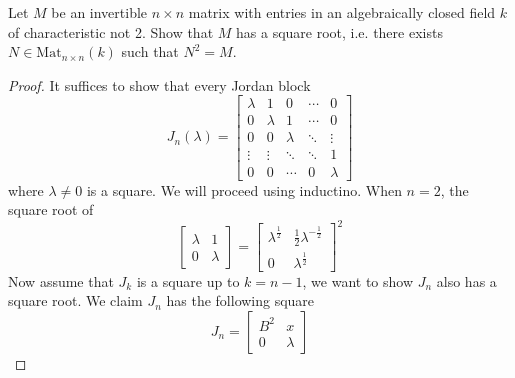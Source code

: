 \documentclass[openany]{book}
\begin{document}
\begin{prob}
    Let \(M\) be an invertible \(n\times n\) matrix with entries in an algebraically closed field \(k\) of characteristic not 2. Show that \(M\) has a square root, i.e. there exists \(N\in\text{Mat}_{n\times n}(k)\) such that \(N^{2}=M\).
\end{prob}
\begin{proof}
    It suffices to show that every Jordan block 
    \[
        J_n(\lambda) = 
        \begin{bmatrix}
        \lambda & 1       & 0       & \cdots & 0 \\
        0       & \lambda & 1       & \cdots & 0 \\
        0       & 0       & \lambda & \ddots & \vdots \\
        \vdots  & \vdots  & \ddots  & \ddots & 1 \\
        0       & 0       & \cdots  & 0      & \lambda
        \end{bmatrix}
        \]
        where $\lambda\neq 0$ is a square. We will proceed using inductino. When $n=2$, the square root of 
        \begin{equation*}
            \begin{bmatrix}
                \lambda&1\\
                0&\lambda
            \end{bmatrix}=\begin{bmatrix}
                \lambda^\frac{1}{2}&\frac{1}{2}\lambda^{-\frac{1}{2}}\\
                0&\lambda^\frac{1}{2}
            \end{bmatrix}^2
        \end{equation*} 
        Now assume that $J_{k}$ is a square up to $k=n-1$, we want to show $J_n$ also has a square root. We claim $J_n$ has the following square 
        \begin{equation*}
            J_n=\begin{bmatrix}
                B^2&x\\
                0&\lambda


\end{bmatrix}
\end{equation*}
\end{proof}
\end{document}
